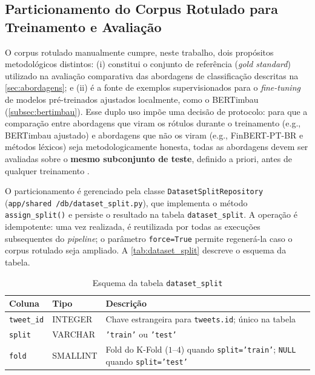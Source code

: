 \subsection{Particionamento do Corpus Rotulado para Treinamento e Avaliação}
\label{subsec:particionamento}

O corpus rotulado manualmente cumpre, neste trabalho, dois propósitos metodológicos distintos: (i) constitui o conjunto de referência (\textit{gold standard}) utilizado na avaliação comparativa das abordagens de classificação descritas na \autoref{sec:abordagens}; e (ii) é a fonte de exemplos supervisionados para o \textit{fine-tuning} de modelos pré-treinados ajustados localmente, como o BERTimbau (\autoref{subsec:bertimbau}). Esse duplo uso impõe uma decisão de protocolo: para que a comparação entre abordagens que viram os rótulos durante o treinamento (e.g., BERTimbau ajustado) e abordagens que não os viram (e.g., FinBERT-PT-BR e métodos léxicos) seja metodologicamente honesta, todas as abordagens devem ser avaliadas sobre o \textbf{mesmo subconjunto de teste}, definido a priori, antes de qualquer treinamento \cite{jurafsky2026,caseli2024cap1}.

O particionamento é gerenciado pela classe \texttt{DatasetSplitRepository} (\texttt{app/shared /db/dataset\_split.py}), que implementa o método \texttt{assign\_split()} e persiste o resultado na tabela \texttt{dataset\_split}. A operação é idempotente: uma vez realizada, é reutilizada por todas as execuções subsequentes do \textit{pipeline}; o parâmetro \texttt{force=True} permite regenerá-la caso o corpus rotulado seja ampliado. A \autoref{tab:dataset_split} descreve o esquema da tabela.

\begin{table}[!htbp]
	\caption{Esquema da tabela \texttt{dataset\_split}}
	\label{tab:dataset_split}
	\centering
	\begin{tabular}{llp{8.2cm}}
		\hline
		\textbf{Coluna} & \textbf{Tipo} & \textbf{Descrição} \\
		\hline
		\texttt{tweet\_id} & INTEGER & Chave estrangeira para \texttt{tweets.id}; único na tabela \\
		\hline
		\texttt{split}     & VARCHAR & \texttt{'train'} ou \texttt{'test'} \\
		\hline
		\texttt{fold}      & SMALLINT & Fold do K-Fold ($1$--$4$) quando \texttt{split='train'}; \texttt{NULL} quando \texttt{split='test'} \\
		\hline
	\end{tabular}
\end{table}


